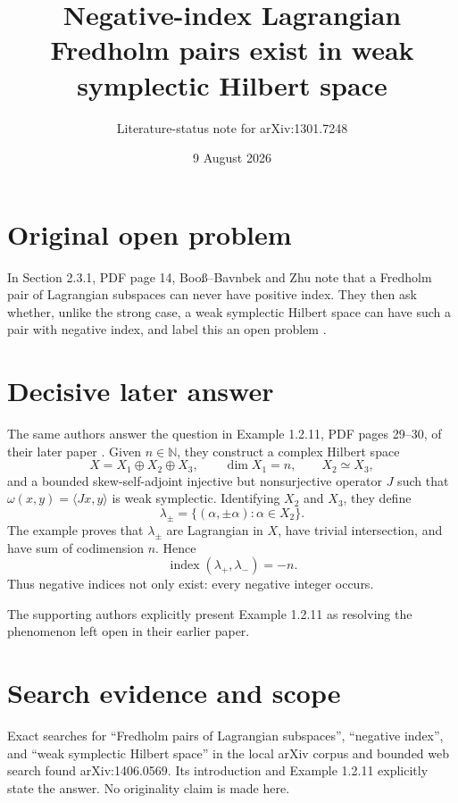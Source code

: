 \documentclass[11pt]{article}
\title{Negative-index Lagrangian Fredholm pairs exist in weak symplectic Hilbert space}
\author{Literature-status note for arXiv:1301.7248}
\date{9 August 2026}
\begin{document}
\maketitle

\begin{center}
\end{center}

\section*{Original open problem}

In Section 2.3.1, PDF page 14, Boo\ss--Bavnbek and Zhu note that a
Fredholm pair of Lagrangian subspaces can never have positive index.  They
then ask whether, unlike the strong case, a weak symplectic Hilbert space can
have such a pair with negative index, and label this an open problem
\cite{Original}.

\section*{Decisive later answer}

The same authors answer the question in Example 1.2.11, PDF pages 29--30, of
their later paper \cite{Answer}.  Given $n\in\mathbb N$, they construct a
complex Hilbert space
\[
 X=X_1\oplus X_2\oplus X_3,\qquad \dim X_1=n,\qquad X_2\simeq X_3,
\]
and a bounded skew-self-adjoint injective but nonsurjective operator $J$ such
that $\omega(x,y)=\langle Jx,y\rangle$ is weak symplectic.  Identifying
$X_2$ and $X_3$, they define
\[
 \lambda_\pm=\{(\alpha,\pm\alpha):\alpha\in X_2\}.
\]
The example proves that $\lambda_\pm$ are Lagrangian in $X$, have trivial
intersection, and have sum of codimension $n$.  Hence
\[
 \operatorname{index}(\lambda_+,\lambda_-)=-n.
\]
Thus negative indices not only exist: every negative integer occurs.

The supporting authors explicitly present Example 1.2.11 as resolving the
phenomenon left open in their earlier paper.

\section*{Search evidence and scope}

Exact searches for ``Fredholm pairs of Lagrangian subspaces'', ``negative
index'', and ``weak symplectic Hilbert space'' in the local arXiv corpus and
bounded web search found arXiv:1406.0569.  Its introduction and Example
1.2.11 explicitly state the answer.  No originality claim is made here.
\end{document}
